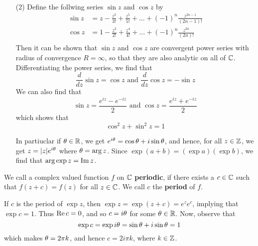 \begin{example}
\begin{enumerate}
        \item[(2)] Define the follwing series $\sin{z}$ and $\cos{z}$ by
            \begin{align*}
                \sin{z} &=
                            z-\frac{z^3}{3!}+\frac{z^5}{5!}+\dots+(-1)^n\frac{z^{2n-1}}{(2n-1)!}    \\
                \cos{z} &=
                            1-\frac{z^2}{2!}+\frac{z^4}{4!}+\dots+(-1)^n\frac{z^{2n}}{(2n)!}    \\
            \end{align*}
            Then it can be shown that $\sin{z}$ and $\cos{z}$ are convergent
            power series with radius of convergence $R=\infty$, so that they
            are also analytic on all of  $\mathbb{C}$. Differentiating the power series,
            we find that
            \begin{equation*}
                \frac{d}{dz}{\sin{z}}=\cos{z} \text{ and }
                \frac{d}{dz}{\cos{z}}=-\sin{z}
            \end{equation*}
            We can also find that
            \begin{equation*}
                \sin{z}=\frac{e^{iz}-e^{-iz}}{2} \text{ and }
                \cos{z}=\frac{e^{iz}+e^{-iz}}{2}
            \end{equation*}
            which shows that
            \begin{equation*}
                \cos^2{z}+\sin^2{z}=1
            \end{equation*}

            In partiuclar if $\theta \in \mathbb{R}$, we get
            $e^{i\theta}=\cos{\theta}+i\sin{\theta}$, and hence, for all $z \in \mathbb{Z}$, we
            get $z=|z|e^{i\theta}$ where $\theta=\arg{z}$. Since
            $\exp{(a+b)}=(\exp{a})(\exp{b})$, we find that
            $\arg{\exp{z}}=\operatorname{Im}{z}$.
    \end{enumerate}
\end{example}

\begin{definition}
    We call a complex valued function $f$ on $\mathbb{C}$ \textbf{periodic}, if there
    exists a $c \in \mathbb{C}$ such that  $f(z+c)=f(z)$ for all $z \in \mathbb{C}$. We call $c$
    the \textbf{period} of $f$.
\end{definition}

\begin{example}\label{example_3.5}
    If $c$ is the period of  $\exp{z}$, then $\exp{z}=\exp{(z+c)}=e^ze^c$,
    implying that $\exp{c}=1$. Thus $\operatorname{Re}{c}=0$, and so $c=i\theta$ for some  $\theta
    \in \mathbb{R}$. Now, observe that
    \begin{equation*}
        \exp{c}=\exp{i\theta}=\sin{\theta}+i\sin{\theta}=1
    \end{equation*}
    which makes $\theta=2\pi k$, and hence $c=2i\pi k$, where $k \in \mathbb{Z}$.
\end{example}

